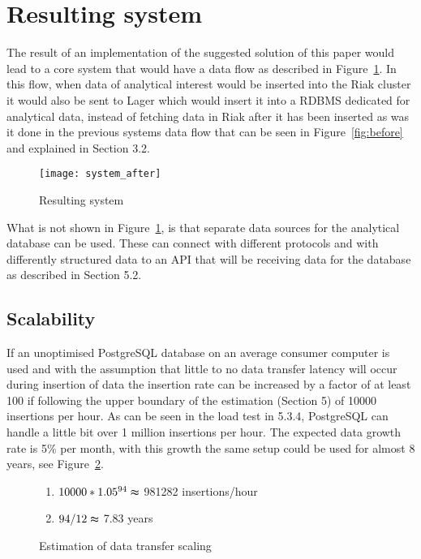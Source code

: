 \documentclass[a4paper,12pt]{article}
\begin{document}
\FloatBarrier
{}
\newpage
\section{Resulting system}
The result of an implementation of the suggested solution of this paper would lead to a core system that would have a data flow as described in Figure~\ref{fig:result}.
In this flow, when data of analytical interest would be inserted into the Riak cluster it would also be sent to Lager which would insert it into a RDBMS dedicated for 
analytical data, instead of fetching data in Riak after it has been inserted as was it done in the previous systems data flow that can be seen in Figure~\ref{fig:before} and explained in Section 3.2.

\begin{figure}[h!]
    \vspace{0.25in}
    \centerline{\texttt{[image: system\_after]}}
    \caption{Resulting system}
    \label{fig:result}
\end{figure}

What is not shown in Figure~\ref{fig:result}, is that separate data sources for the analytical database can be used. These can connect with different protocols and with differently 
structured data to an API that will be receiving data for the database as described in Section 5.2.

\subsection{Scalability}
\label{SCALABILITYRESULT}
If an unoptimised PostgreSQL database on an average consumer computer is used and with the assumption that little to no data transfer latency will occur during insertion of data the insertion rate can 
be increased by a factor of at least 100 if following the upper boundary of the estimation (Section 5) of 10000 insertions per hour. As can be seen in the load test in 5.3.4, PostgreSQL can handle a little bit over 
1 million insertions per hour. The expected data growth rate is 5\% per month, with this growth the same setup could be used for almost 8 years, see Figure~\ref{fig:scalability}.

\begin{figure}[h!]
\begin{framed}
\begin{enumerate}
\item $10000*1.05^{94} \thickapprox $ 981282 insertions/hour 
\item $94/12 \thickapprox $ 7.83 years 
\end{enumerate}
\end{framed}
\caption{Estimation of data transfer scaling}
\label{fig:scalability}
\end{figure}
\end{document}
